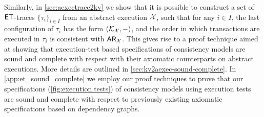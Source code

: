 Similarly, in \cref{sec:aexectrace2kv} we show that it is possible to 
construct a set of $\mathsf{ET}$-traces $\{\tau_{i}\}_{i \in I}$ from an abstract execution $\mathcal{X}$, such that 
for any $i \in I$, the last configuration of $\tau_{i}$ has the form $(\mathcal{K}_{\mathcal{X}}, -)$, and 
the order in which transactions are executed in $\tau_{i}$ is consistent with $\mathsf{AR}_{\mathcal{X}}$. 
This gives rise to a proof technique aimed at showing that execution-test based specifications 
of consistency models are sound and complete with respect with their axiomatic counterparts on abstract executions. 
More details are outlined in \cref{sec:kv2aexec-sound-complete}. 
In \cref{app:et_sound_complete} we employ our proof techniques to prove that our specifications (\cref{fig:execution.tests})
of consistency models using execution tests are sound and complete with respect to previously 
existing axiomatic specifications based on dependency graphs.
%
%
